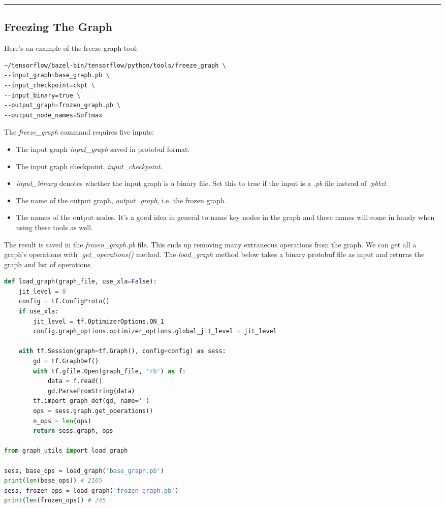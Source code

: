 \documentclass[12pt, draft]{report}
\begin{document}
\noindent\rule{\textwidth}{1pt}
\subsection*{Freezing The Graph}
\begin{changemargin}{0.5cm}{2.0cm}
Here’s an example of the freeze graph tool:
\begin{lstlisting}[language=Bash]
~/tensorflow/bazel-bin/tensorflow/python/tools/freeze_graph \
--input_graph=base_graph.pb \
--input_checkpoint=ckpt \
--input_binary=true \
--output_graph=frozen_graph.pb \
--output_node_names=Softmax
\end{lstlisting}
The \textit{freeze\_graph} command requires five inputs:
\begin{itemize}
    \item The input graph \textit{input\_graph} saved in protobuf format.
    \item The input graph checkpoint, \textit{input\_checkpoint}.
    \item \textit{input\_binary} denotes whether the input graph is a binary file. Set this to true if the input is a \textit{.pb} file instead of \textit{.pbtxt}.
    \item The name of the output graph, \textit{output\_graph}, i.e. the frozen graph.
    \item The names of the output nodes. It’s a good idea in general to name key nodes in the graph and these names will come in handy when using these tools as well.
\end{itemize}
The result is saved in the \textit{frozen\_graph.pb} file. This ends up removing many extraneous operations from the graph.
We can get all a graph’s operations with \textit{.get\_operations()} method. The \textit{load\_graph} method below takes a
binary protobuf file as input and returns the graph and list of operations.
\begin{lstlisting}[language=Python]
def load_graph(graph_file, use_xla=False):
    jit_level = 0
    config = tf.ConfigProto()
    if use_xla:
        jit_level = tf.OptimizerOptions.ON_1
        config.graph_options.optimizer_options.global_jit_level = jit_level

    with tf.Session(graph=tf.Graph(), config=config) as sess:
        gd = tf.GraphDef()
        with tf.gfile.Open(graph_file, 'rb') as f:
            data = f.read()
            gd.ParseFromString(data)
        tf.import_graph_def(gd, name='')
        ops = sess.graph.get_operations()
        n_ops = len(ops)
        return sess.graph, ops

from graph_utils import load_graph

sess, base_ops = load_graph('base_graph.pb')
print(len(base_ops)) # 2165
sess, frozen_ops = load_graph('frozen_graph.pb')
print(len(frozen_ops)) # 245
\end{lstlisting}
\end{changemargin}
\end{document}
